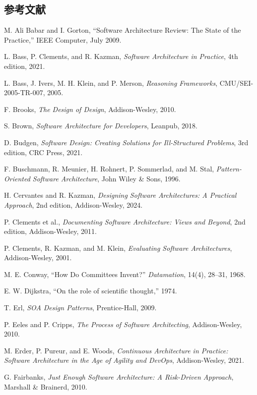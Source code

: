 \subsection{参考文献}
{\small\sloppy
\begin{enumerate}[label={[\arabic*]},leftmargin=2.5em]
\item M. Ali Babar and I. Gorton, ``Software Architecture Review: The State of the Practice,'' IEEE Computer, July 2009.
\item L. Bass, P. Clements, and R. Kazman, \textit{Software Architecture in Practice}, 4th edition, 2021.
\item L. Bass, J. Ivers, M. H. Klein, and P. Merson, \textit{Reasoning Frameworks}, CMU/SEI-2005-TR-007, 2005.
\item F. Brooks, \textit{The Design of Design}, Addison-Wesley, 2010.
\item S. Brown, \textit{Software Architecture for Developers}, Leanpub, 2018.
\item D. Budgen, \textit{Software Design: Creating Solutions for Ill-Structured Problems}, 3rd edition, CRC Press, 2021.
\item F. Buschmann, R. Meunier, H. Rohnert, P. Sommerlad, and M. Stal, \textit{Pattern-Oriented Software Architecture}, John Wiley \& Sons, 1996.
\item H. Cervantes and R. Kazman, \textit{Designing Software Architectures: A Practical Approach}, 2nd edition, Addison-Wesley, 2024.
\item P. Clements et al., \textit{Documenting Software Architecture: Views and Beyond}, 2nd edition, Addison-Wesley, 2011.
\item P. Clements, R. Kazman, and M. Klein, \textit{Evaluating Software Architectures}, Addison-Wesley, 2001.
\item M. E. Conway, ``How Do Committees Invent?'' \textit{Datamation}, 14(4), 28--31, 1968.
\item E. W. Dijkstra, ``On the role of scientific thought,'' 1974.
\item T. Erl, \textit{SOA Design Patterns}, Prentice-Hall, 2009.
\item P. Eeles and P. Cripps, \textit{The Process of Software Architecting}, Addison-Wesley, 2010.
\item M. Erder, P. Pureur, and E. Woods, \textit{Continuous Architecture in Practice: Software Architecture in the Age of Agility and DevOps}, Addison-Wesley, 2021.
\item G. Fairbanks, \textit{Just Enough Software Architecture: A Risk-Driven Approach}, Marshall \& Brainerd, 2010.

\end{enumerate}}
